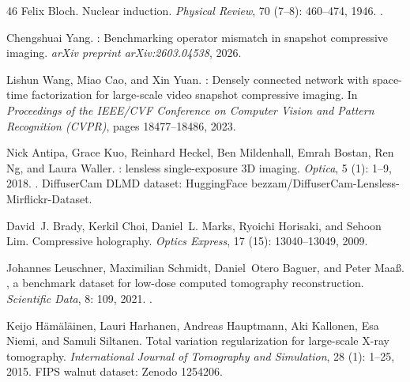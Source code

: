 \documentclass[11pt]{article}
\begin{document}
\begin{thebibliography}{46}
Felix Bloch.
\newblock Nuclear induction.
\newblock \emph{Physical Review}, 70 (7--8): 460--474, 1946.
\newblock {}.

Chengshuai Yang.
: Benchmarking operator mismatch in snapshot compressive
  imaging.
\newblock \emph{arXiv preprint arXiv:2603.04538}, 2026{}.

Lishun Wang, Miao Cao, and Xin Yuan.
: Densely connected network with space-time
  factorization for large-scale video snapshot compressive imaging.
\newblock In \emph{Proceedings of the IEEE/CVF Conference on Computer Vision
  and Pattern Recognition (CVPR)}, pages 18477--18486, 2023{}.

Nick Antipa, Grace Kuo, Reinhard Heckel, Ben Mildenhall, Emrah Bostan, Ren Ng,
  and Laura Waller.
: lensless single-exposure 3{D} imaging.
\newblock \emph{Optica}, 5 (1): 1--9, 2018.
\newblock {}.
\newblock DiffuserCam DLMD dataset: HuggingFace
  bezzam/DiffuserCam-Lensless-Mirflickr-Dataset.

David~J. Brady, Kerkil Choi, Daniel~L. Marks, Ryoichi Horisaki, and Sehoon Lim.
\newblock Compressive holography.
\newblock \emph{Optics Express}, 17 (15): 13040--13049, 2009.

Johannes Leuschner, Maximilian Schmidt, Daniel~Otero Baguer, and Peter
  Maa{\ss}.
, a benchmark dataset for low-dose computed tomography
  reconstruction.
\newblock \emph{Scientific Data}, 8: 109, 2021.
\newblock {}.

Keijo H{\"a}m{\"a}l{\"a}inen, Lauri Harhanen, Andreas Hauptmann, Aki Kallonen,
  Esa Niemi, and Samuli Siltanen.
\newblock Total variation regularization for large-scale {X}-ray tomography.
\newblock \emph{International Journal of Tomography and Simulation},
  28 (1): 1--25, 2015.
\newblock FIPS walnut dataset: Zenodo 1254206.


\end{thebibliography}
\end{document}
